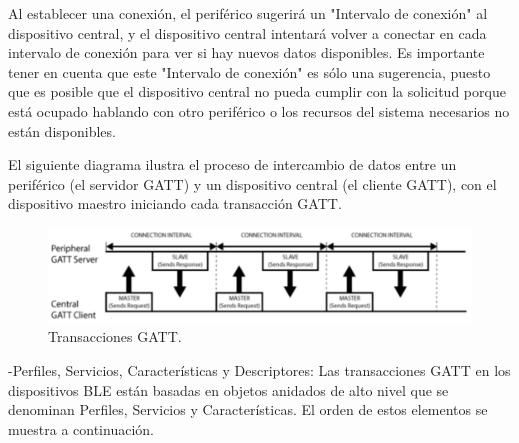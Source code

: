 Al establecer una conexión, el periférico sugerirá un "Intervalo de conexión" al dispositivo central, y el dispositivo central intentará volver a conectar en cada intervalo de conexión para ver si hay nuevos datos disponibles. Es importante tener en cuenta que este "Intervalo de conexión" es sólo una sugerencia, puesto que es posible que el dispositivo central no pueda cumplir con la solicitud porque está ocupado hablando con otro periférico o los recursos del sistema necesarios no están disponibles.

El siguiente diagrama ilustra el proceso de intercambio de datos entre un periférico (el servidor GATT) y un dispositivo central (el cliente GATT), con el dispositivo maestro iniciando cada transacción GATT.\newline

\begin{figure}[H]
	\centering
	\includegraphics[scale=0.4]{figuras/rn4020/gatt.png}
	\caption{Transacciones GATT.}
	\label{gatt}
\end{figure}



-Perfiles, Servicios, Características y Descriptores: Las transacciones GATT en los dispositivos BLE están basadas en objetos anidados de alto nivel que se denominan Perfiles, Servicios y Características. El orden de estos elementos se muestra a continuación.


